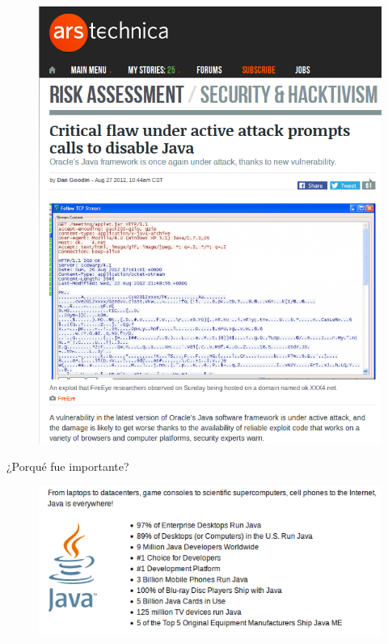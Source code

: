 \documentclass[12pt]{beamer}
\begin{document}
\begin{frame}
\begin{figure}
\centering
\includegraphics[width=\linewidth]{Images/not4}
\end{figure}
\end{frame}

\begin{frame}
\LARGE \centering ¿Porqué fue importante?
\end{frame}

\begin{frame}
\begin{figure}
\centering
\includegraphics[width=\linewidth]{Images/javapop}
\end{figure}
\end{frame}
\end{document}
